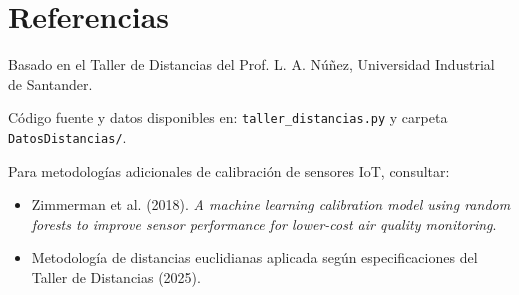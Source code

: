 \documentclass[spanish,notitlepage,letterpaper,11pt]{article} %
\begin{document}
\section{Referencias}
Basado en el Taller de Distancias del Prof. L. A. Núñez, Universidad Industrial de Santander. 

Código fuente y datos disponibles en: \texttt{taller\_distancias.py} y carpeta \texttt{DatosDistancias/}.

Para metodologías adicionales de calibración de sensores IoT, consultar:
\begin{itemize}
\item Zimmerman et al. (2018). \textit{A machine learning calibration model using random forests to improve sensor performance for lower-cost air quality monitoring}.
\item Metodología de distancias euclidianas aplicada según especificaciones del Taller de Distancias (2025).
\end{itemize}
\end{document}
